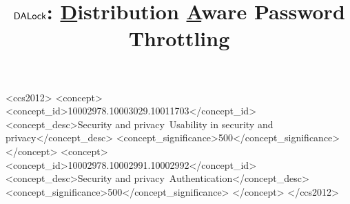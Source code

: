 \documentclass[sigconf, anonymous]{acmart}
\begin{document}
\title{$\mathsf{DALock}$:  \underline{D}istribution \underline{A}ware Password Throttling} 

\begin{abstract}
	
\end{abstract}



\begin{CCSXML}
<ccs2012>
<concept>
<concept_id>10002978.10003029.10011703</concept_id>
<concept_desc>Security and privacy~Usability in security and privacy</concept_desc>
<concept_significance>500</concept_significance>
</concept>
<concept>
<concept_id>10002978.10002991.10002992</concept_id>
<concept_desc>Security and privacy~Authentication</concept_desc>
<concept_significance>500</concept_significance>
</concept>
</ccs2012>
\end{CCSXML}




\maketitle

 
\newpage


\end{document}
